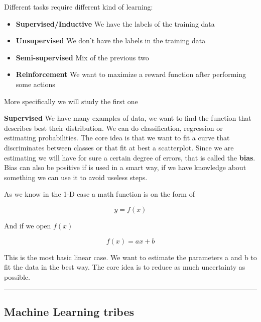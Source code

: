 \vspace{10pt}

Different tasks require different kind of learning:

\begin{itemize}
    \item \textbf{Supervised/Inductive} \ra We have the labels of the training data
    \item \textbf{Unsupervised} \ra We don't have the labels in the training data
    \item \textbf{Semi-supervised} \ra Mix of the previous two
    \item \textbf{Reinforcement} \ra We want to maximize a reward function after performing some actions
\end{itemize}

More specifically we will study the first one

\vspace{10pt}

\textbf{Supervised} \ra We have many examples of data, we want to find the function that describes best their distribution. We can do classification, regression or estimating probabilities. The core idea is that we want to fit a curve that discriminates between classes or that fit at best a scatterplot. Since we are estimating we will have for sure a certain degree of errors, that is called the \textbf{bias}. Bias can also be positive if is used in a smart way, if we have knowledge about something we can use it to avoid useless steps.

\vspace{10pt}

As we know in the 1-D case a math function is on the form of 

\begin{equation}
    y = f(x)
\end{equation}

And if we open $f(x)$

\begin{equation}
    f(x) = ax + b
\end{equation}

This is the most basic linear case. We want to estimate the parameters a and b to fit the data in the best way. The core idea is to reduce as much uncertainty as possible.

\hrule

\subsection{Machine Learning tribes}

